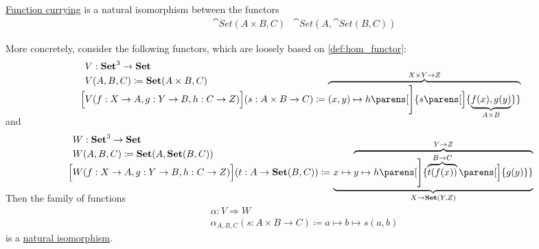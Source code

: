 \begin{proposition}\label{thm:currying_is_natural_isomorphism}
  \hyperref[def:function_currying]{Function currying} is a natural isomorphism between the functors
  \begin{align*}
    &\cat{Set}(A \times B, C)
    &\cat{Set}(A, \cat{Set}(B, C))
  \end{align*}

  More concretely, consider the following functors, which are loosely based on \cref{def:hom_functor}:
  \begin{equation*}
    \begin{aligned}
      &V: \cat{Set}^3 \to \cat{Set} \\
      &V(A, B, C) \coloneqq \cat{Set}(A \times B, C) \\
      \Big[& V(f: X \to A, g: Y \to B, h: C \to Z) \Big](s: A \times B \to C) \coloneqq \smash{ \overbrace{ (x, y) \mapsto h\parens[\Bigg]{ s\parens[\Big]{ \underbrace{ f(x), g(y) }_{A \times B} } } }^{X \times Y \to Z} } \\
    \end{aligned}
  \end{equation*}
  and
  \begin{equation*}
    \begin{aligned}
      &W: \cat{Set}^3 \to \cat{Set} \\
      &W(A, B, C) \coloneqq \cat{Set}(A, \cat{Set}(B, C)) \\
      \Big[& W(f: X \to A, g: Y \to B, h: C \to Z) \Big](t: A \to \cat{Set}(B, C)) \coloneqq \smash{ \underbrace{ x \mapsto \overbrace{y \mapsto h\parens[\Bigg]{ \overbrace{t(f(x))}^{B \to C}\parens[\Big]{ g(y) } } }^{Y \to Z} }_{X \to \cat{Set}(Y, Z)} } \\
    \end{aligned}
  \end{equation*}

  Then the family of functions
  \begin{equation*}
    \begin{aligned}
      &\alpha: V \Rightarrow W \\
      &\alpha_{A,B,C}(s: A \times B \to C) \coloneqq a \mapsto b \mapsto s(a, b)
    \end{aligned}
  \end{equation*}
  is a \hyperref[thm:natural_isomorphism]{natural isomorphism}.
\end{proposition}
